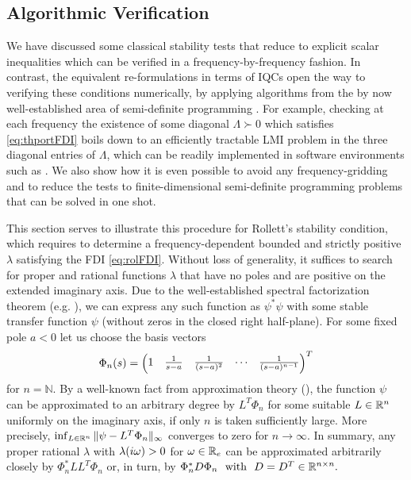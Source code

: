 \subsection{Algorithmic Verification}\label{sec:algver}

We have discussed some classical stability tests that reduce to explicit scalar 
inequalities which can be verified in a frequency-by-frequency fashion. In contrast, 
the equivalent re-formulations in terms of IQCs open the way to verifying these conditions 
numerically, by applying algorithms from the by now well-established area of semi-definite 
programming \cite{lmiboydbook}. For example, checking at each frequency the existence of 
some diagonal $\Lambda\succ 0$ which satisfies \eqref{eq:thportFDI} boils down to an 
efficiently tractable LMI problem in the three diagonal entries of $\Lambda$, which 
can be readily implemented in software environments such as \cite{yalmip}. We also 
show how it is even possible to avoid any frequency-gridding and to reduce the tests 
to finite-dimensional semi-definite programming problems that can be solved in one shot.

This section serves to illustrate this procedure for Rollett's stability condition, 
which requires to determine a frequency-dependent bounded and strictly positive 
$\lambda$ satisfying the FDI \eqref{eq:rolFDI}. Without loss of generality, it 
suffices to search for proper and rational functions $\lambda$ that have no poles 
and are positive on the extended imaginary axis. Due to the well-established spectral 
factorization theorem (e.g. \cite{francis}), we can express any such function as 
$\psi^*\psi$ with some stable transfer function $\psi$ (without zeros in the closed 
right half-plane). For some fixed pole $a<0$ let us choose the basis vectors
\begin{equation*}
\Phi_n(s) = \begin{pmatrix}1 &\frac{1}{s-a} &\frac{1}{(s-a)^2} &\cdots &\frac{1}{(s-a)^{n-1}}\end{pmatrix}^T
\end{equation*}
for $n=\mathbb{N}$. By a well-known fact from approximation theory (\cite{pinkus}), 
the function $\psi$ can be approximated to an arbitrary degree by $L^T\Phi_n$ for some 
suitable $L\in\mathbb{R}^n$ uniformly on the imaginary axis, if only $n$ is taken sufficiently 
large. More precisely, $\inf_{L\in\mathbb{R}^n}\|\psi-L^T\Phi_n\|_\infty$ converges to zero for 
$n\to\infty$. In summary, any proper rational $\lambda$ with $\lambda(i\omega)>0$ for 
$\omega\in\mathbb{R}_e$ can be approximated arbitrarily closely by $\Phi_n^*LL^T\Phi_n$ or, 
in turn, by $\Phi_n^*D\Phi_n\text{\ \ with\ \ }D=D^T\in\mathbb{R}^{n\times n}.$

